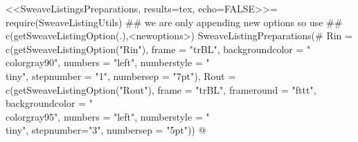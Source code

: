 \RequirePackage{fancyvrb}
\RequirePackage{listings}
<<SweaveListingsPreparations, results=tex, echo=FALSE>>=
require(SweaveListingUtils)
 ## we are only appending new options so use 
 ## c(getSweaveListingOption(.),<newoptions>)
SweaveListingPreparations(#
        Rin = c(getSweaveListingOption("Rin"),
                frame = "trBL", 
                backgroundcolor = "\\color{gray90}",
                numbers = "left", 
                numberstyle = "\\tiny",
                stepnumber = "1",
                numbersep = "7pt"),
        Rout = c(getSweaveListingOption("Rout"),
                 frame = "trBL", 
                 frameround = "fttt", 
                 backgroundcolor = "\\color{gray95}",
                 numbers = "left", 
                 numberstyle = "\\tiny",
                 stepnumber="3",
                 numbersep = "5pt"))
@

